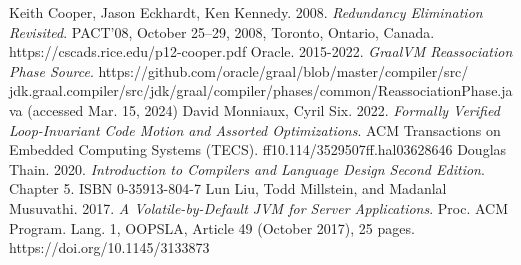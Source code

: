\documentclass[12pt,openany,a4paper]{book}
\begin{document}
\begin{thebibliography}{99}
 Keith Cooper, Jason Eckhardt, Ken Kennedy. 2008. \emph{Redundancy Elimination Revisited}. PACT’08, October 25–29, 2008, Toronto, Ontario, Canada. https://cscads.rice.edu/p12-cooper.pdf
 Oracle. 2015-2022. \emph{GraalVM Reassociation Phase Source}. https://github.com/oracle/graal/blob/master/compiler/src/\\jdk.graal.compiler/src/jdk/graal/compiler/phases/common/ReassociationPhase.java (accessed Mar. 15, 2024)
 David Monniaux, Cyril Six. 2022. \emph{Formally Verified Loop-Invariant Code Motion and Assorted Optimizations}. ACM Transactions on Embedded Computing Systems (TECS). ff10.114/3529507ff.hal03628646
 Douglas Thain. 2020. \emph{Introduction to Compilers and Language Design Second Edition}. Chapter 5. ISBN 0-35913-804-7
 Lun Liu, Todd Millstein, and Madanlal Musuvathi. 2017. \emph{A Volatile-by-Default JVM for Server Applications}. Proc. ACM Program. Lang. 1, OOPSLA, Article 49 (October 2017), 25 pages. https://doi.org/10.1145/3133873
\end{thebibliography}
\end{document}
